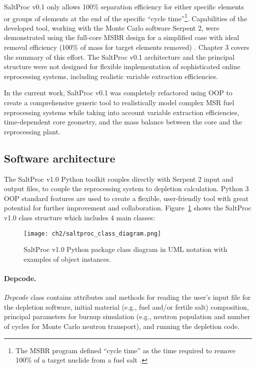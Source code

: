 SaltProc v0.1 only allows 100\% separation efficiency for either specific 
elements or groups of elements at the end of the specific ``cycle 
time''\footnote{The \gls{MSBR} program defined ``cycle time'' as the time 
required to remove 100\% of a target nuclide from a fuel salt  
\cite{robertson_conceptual_1971}.}. Capabilities of the developed tool, 
working with the Monte Carlo software Serpent 2, were demonstrated using the 
full-core MSBR design for a simplified case with ideal removal efficiency 
(100\% of mass for target elements removed) \cite{rykhlevskii_modeling_2019}. 
Chapter 3 covers the summary of this effort.
The SaltProc v0.1 architecture and the principal structure were not designed 
for flexible implementation of sophisticated online reprocessing systems, 
including realistic variable extraction efficiencies. 

In the current work, SaltProc v0.1 was completely refactored using \gls{OOP} 
to create a comprehensive generic tool to realistically model complex 
\gls{MSR} fuel reprocessing systems while taking into account variable 
extraction efficiencies, time-dependent core geometry, and the mass balance 
between the core and the reprocessing plant.

\subsection{Software architecture} 

The SaltProc v1.0 Python toolkit couples directly with Serpent 2 input 
and output files, to couple the reprocessing system to depletion calculation. 
Python 3 \gls{OOP} standard features are used to create a flexible, 
user-friendly tool with great potential for further improvement and 
collaboration. Figure~\ref{fig:saltproc_class} shows the SaltProc v1.0 class 
structure which includes 4 main classes:
\begin{figure}[ht!] %
	\texttt{[image: ch2/saltproc\_class\_diagram.png]}
	\vspace{-0.15in}
	\caption{SaltProc v1.0 Python package class diagram in UML 
	notation with examples of object instances.}
	\label{fig:saltproc_class}
\end{figure}
\paragraph*{Depcode.}\textit{Depcode} class contains attributes and methods 
for reading the user's input file for the depletion software, initial material 
(e.g., fuel and/or fertile salt) composition, principal parameters for burnup 
simulation (e.g., neutron population and number of cycles for Monte Carlo 
neutron transport), and running the depletion code.
